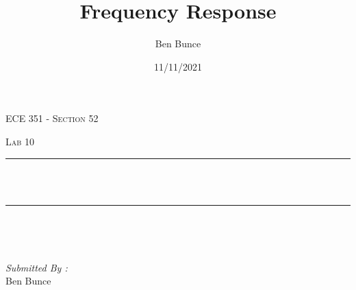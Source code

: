 \documentclass[12pt]{report}
\title{Frequency Response}
\author{Ben Bunce}
\date{11/11/2021}
\makeatletter
\let\thetitle\@title
\makeatother
\begin{document}

\begin{titlepage}
	\centering
    \vspace*{0.5 cm}
\begin{center}    \textsc{\Large   ECE 351 - Section 52}\\[2.0 cm]	\end{center}%
	\textsc{\Large Lab 10  }\\[0.5 cm]				%
	\rule{\linewidth}{0.2 mm} \\[0.4 cm]
	{ \huge \bfseries \thetitle}\\
	\rule{\linewidth}{0.2 mm} \\[1.5 cm]
	
	\begin{minipage}{0.4\textwidth}
		\begin{flushleft} \large
			\end{flushleft}
			\end{minipage}~
			\begin{minipage}{0.4\textwidth}
            
			\begin{flushright} \large
			\emph{Submitted By :} \\
			Ben Bunce  
		\end{flushright}
           
	\end{minipage}\\[2 cm]
	
    
    
    
    
	
\end{titlepage}


\tableofcontents
\pagebreak

\renewcommand{\thesection}{\arabic{section}}
\end{document}
